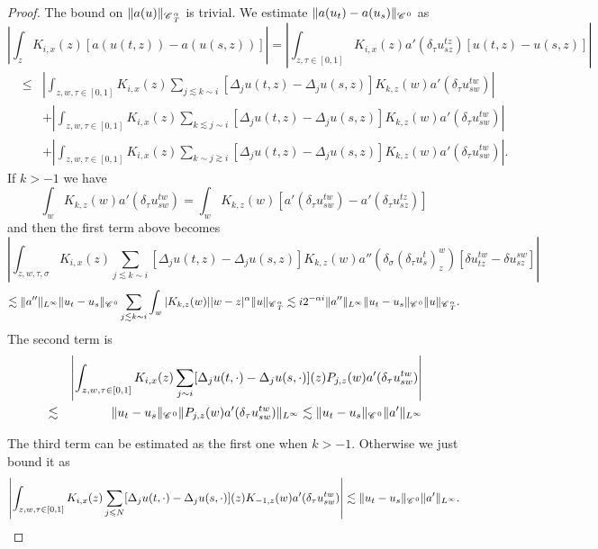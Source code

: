 \documentclass[11pt,reqno]{amsart}
\newcommand{\cdummy}{\cdot}
\newcommand{\CC}{\mathscr{C} \hspace{.1em}}
\begin{document}
\begin{proof}
  The bound on $\| a (u) \|_{\CC_T^{\alpha}}$ is trivial. We estimate $\| a
  (u_t) - a (u_s) \|_{\CC^0}$ as
  \[ \left| \int_z K_{i, x} (z) [a (u (t, z)) - a (u (s, z))] \right| = \left|
     \int_{z, \tau \in [0, 1]} K_{i, x} (z) a' (\delta_{\tau} u^{t z}_{s z})
     [u (t, z) - u (s, z)] \right| \]
  \begin{eqnarray*}
    & \leqslant & \left| \int_{z, w, \tau \in [0, 1]} K_{i, x} (z) \sum_{j
    \lesssim k \sim i} [\Delta_j u (t, z) - \Delta_j u (s, z)] K_{k, z} (w) a'
    (\delta_{\tau} u^{t w}_{s w}) \right|\\
    &  & + \left| \int_{z, w, \tau \in [0, 1]} K_{i, x} (z) \sum_{k \lesssim
    j \sim i} [\Delta_j u (t, z) - \Delta_j u (s, z)] K_{k, z} (w) a'
    (\delta_{\tau} u^{t w}_{s w}) \right|\\
    &  & + \left| \int_{z, w, \tau \in [0, 1]} K_{i, x} (z) \sum_{k \sim j
    \gtrsim i} [\Delta_j u (t, z) - \Delta_j u (s, z)] K_{k, z} (w) a'
    (\delta_{\tau} u^{t w}_{s w}) \right| .
  \end{eqnarray*}
  If $k > - 1$ we have
  \[ \int_w K_{k, z} (w) a' (\delta_{\tau} u^{t w}_{s w}) = \int_w K_{k, z}
     (w) [a' (\delta_{\tau} u^{t w}_{s w}) - a' (\delta_{\tau} u^{t z}_{s z})]
  \]
  and then the first term above becomes
  \[ \left| \int_{z, w, \tau, \sigma} K_{i, x} (z) \sum_{j \lesssim k \sim i}
     [\Delta_j u (t, z) - \Delta_j u (s, z)] K_{k, z} (w) a'' (\delta_{\sigma}
     (\delta_{\tau} u^t_s)^w_z) [\delta u^{t w}_{t z} - \delta u^{s w}_{s z}]
     \right| \]
  \[ \lesssim \| a'' \|_{L^{\infty}} \| u_t - u_s \|_{\CC^0} \sum_{j \lesssim
     k \sim i} \int_w | K_{k, z} (w) | | w - z |^{\alpha} \| u
     \|_{\CC^{\alpha}_T} \lesssim i 2^{- \alpha i} \| a'' \|_{L^{\infty}} \|
     u_t - u_s \|_{\CC^0} \| u \|_{\CC^{\alpha}_T} . \]
  The second term is
  \begin{eqnarray*}
    &  & \left| \int_{z, w, \tau \in [0, 1]} K_{i, x} (z) \sum_{j \sim i}
    [\Delta_j u (t, \cdummy) - \Delta_j u (s, \cdummy)] (z) P_{j, z} (w) a'
    (\delta_{\tau} u^{t w}_{s w}) \right|\\
    & \lesssim & \| u_t - u_s \|_{\CC^0} \| P_{j, z} (w) a' (\delta_{\tau}
    u^{t w}_{s w}) \|_{L^{\infty}} \lesssim \| u_t - u_s \|_{\CC^0} \| a'
    \|_{L^{\infty}}
  \end{eqnarray*}
  
  
  The third term can be estimated as the first one when $k > - 1$. Otherwise
  we just bound it as
  \[ \left| \int_{z, w, \tau \in [0, 1]} K_{i, x} (z) \sum_{j \leqslant N}
     [\Delta_j u (t, \cdummy) - \Delta_j u (s, \cdummy)] (z) K_{- 1, z} (w) a'
     (\delta_{\tau} u^{t w}_{s w}) \right| \lesssim \| u_t - u_s \|_{\CC^0} \|
     a' \|_{L^{\infty}} . \]
  

\end{proof}
\end{document}

